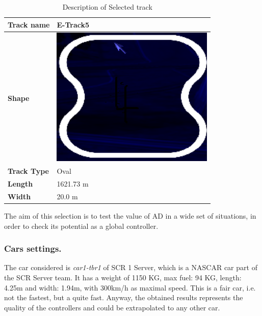 \documentclass[runningheads,a4paper]{llncs}
\begin{document}
	\begin{table}
		\centering
		\caption{Description of Selected track}
		\label{Tabtrack}
		\begin{tabular}{ |p{2cm}|p{2.2 cm}|}
			\hline
			\textbf{Track name}    & E-Track5	\\
			\hline
			\textbf{Shape}   
			& \includegraphics[scale=0.3]{fig/track4.png}			
			\\
			\hline
			\textbf{Track Type}   
			& Oval
			\\
			\hline
			
			\textbf{Length}   
			& 1621.73 m	\\
			\hline
			\textbf{Width}   
			& 20.0 m\\
			\hline
		\end{tabular} 
		
	\end{table}
	
	The aim of this selection is to test the value of AD in a wide set of situations, in order to check its potential as a global controller.
	
	
	
	\subsubsection{Cars settings.}
	
	The car considered is \textit{car1-tbr1} of SCR 1 Server, which is a NASCAR car part of the SCR Server team. It has a weight of 1150 KG, max fuel: 94 KG, length: 4.25m and width: 1.94m, with 300km/h as maximal speed.
	This is a fair car, i.e. not the fastest, but a quite fast. Anyway, the obtained results represents the quality of the controllers and could be extrapolated to any other car.
	
	
\end{document}
